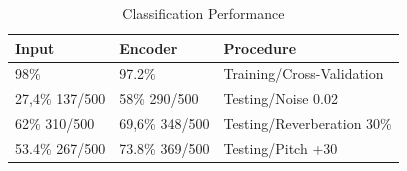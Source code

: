 \documentclass[11pt,a4paper]{article}
\begin{document}
\begin{table}[]
\centering
\caption{Classification Performance}
\label{classification_performances}
\begin{tabular}{|l|l|l|}
\hline
Input          & Encoder        & Procedure                  \\ \hline
98\%           & 97.2\%         & Training/Cross-Validation  \\ \hline
27,4\% 137/500 & 58\% 290/500   & Testing/Noise 0.02         \\ \hline
62\% 310/500   & 69,6\% 348/500 & Testing/Reverberation 30\% \\ \hline
53.4\% 267/500 & 73.8\% 369/500 & Testing/Pitch +30          \\ \hline
\end{tabular}
\end{table}



\end{document}
